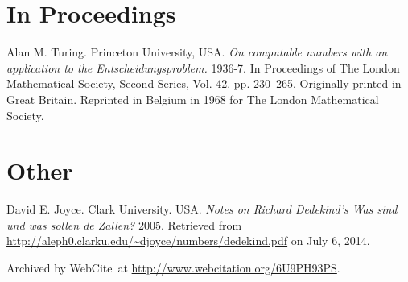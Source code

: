 \begin{thebibliography}{9}
\backrefprint

\section*{In Proceedings}


Alan M. Turing. Princeton University, USA. \emph{On computable numbers with an
application to the Entscheidungsproblem.} 1936-7. In Proceedings of The London
Mathematical Society, Second Series, Vol. 42. pp. 230–265. Originally printed
in Great Britain. Reprinted in Belgium in 1968 for The London Mathematical
Society.

\backrefprint







\section*{Other}


David E. Joyce. Clark University. USA. \emph{Notes on Richard Dedekind's Was
sind und was sollen de Zallen?} 2005. Retrieved from
\url{http://aleph0.clarku.edu/~djoyce/numbers/dedekind.pdf} on July 6, 2014.

Archived by WebCite\textsuperscript{\textregistered}\ at
\url{http://www.webcitation.org/6U9PH93PS}.

\backrefprint





\end{thebibliography}

